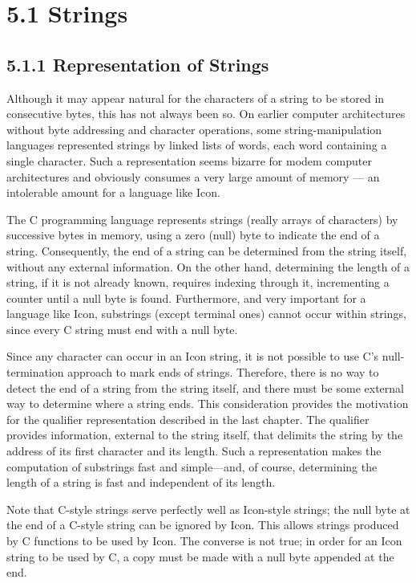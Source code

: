 \section[5.1 Strings]{5.1 Strings}
\subsection[5.1.1 Representation of Strings]{5.1.1 Representation of Strings}

Although it may appear natural for the characters of a string to be
stored in consecutive bytes, this has not always been so. On earlier
computer architectures without byte addressing and character
operations, some string-manipulation languages represented strings by
linked lists of words, each word containing a single character. Such a
representation seems bizarre for modem computer architectures and
obviously consumes a very large amount of memory --- an intolerable amount
for a language like Icon.

The C programming language represents strings (really arrays of
characters) by successive bytes in memory, using a zero (null) byte to
indicate the end of a string. Consequently, the end of a string can be
determined from the string itself, without any external
information. On the other hand, determining the length of a string, if
it is not already known, requires indexing through it, incrementing a
counter until a null byte is found. Furthermore, and very important
for a language like Icon, substrings (except terminal ones) cannot
occur within strings, since every C string must end with a null byte.

Since any character can occur in an Icon string, it is not possible to
use C's null-termination approach to mark ends of strings. Therefore,
there is no way to detect the end of a string from the string itself,
and there must be some external way to determine where a string
ends. This consideration provides the motivation for the qualifier
representation described in the last chapter. The qualifier provides
information, external to the string itself, that delimits the string
by the address of its first character and its length. Such a
representation makes the computation of substrings fast and
simple---and, of course, determining the length of a string is
fast and independent of its length.

Note that C-style strings serve perfectly well as Icon-style strings;
the null byte at the end of a C-style string can be ignored by
Icon. This allows strings produced by C functions to be used by
Icon. The converse is not true; in order for an Icon string to be used
by C, a copy must be made with a null byte appended at the end.

